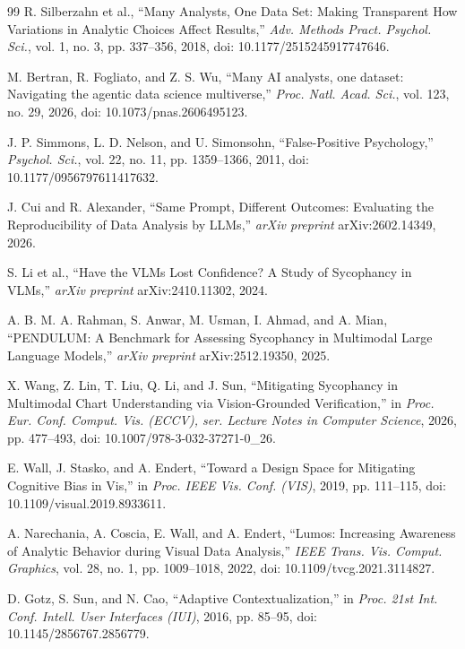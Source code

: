 \documentclass[conference]{IEEEtran}
\begin{document}
\begin{thebibliography}{99}
R. Silberzahn et al., ``Many Analysts, One Data Set: Making Transparent How Variations in Analytic Choices Affect Results,'' \emph{Adv. Methods Pract. Psychol. Sci.}, vol. 1, no. 3, pp. 337--356, 2018, doi: 10.1177/2515245917747646.

M. Bertran, R. Fogliato, and Z. S. Wu, ``Many AI analysts, one dataset: Navigating the agentic data science multiverse,'' \emph{Proc. Natl. Acad. Sci.}, vol. 123, no. 29, 2026, doi: 10.1073/pnas.2606495123.

J. P. Simmons, L. D. Nelson, and U. Simonsohn, ``False-Positive Psychology,'' \emph{Psychol. Sci.}, vol. 22, no. 11, pp. 1359--1366, 2011, doi: 10.1177/0956797611417632.

J. Cui and R. Alexander, ``Same Prompt, Different Outcomes: Evaluating the Reproducibility of Data Analysis by LLMs,'' \emph{arXiv preprint} arXiv:2602.14349, 2026.

S. Li et al., ``Have the VLMs Lost Confidence? A Study of Sycophancy in VLMs,'' \emph{arXiv preprint} arXiv:2410.11302, 2024.

A. B. M. A. Rahman, S. Anwar, M. Usman, I. Ahmad, and A. Mian, ``PENDULUM: A Benchmark for Assessing Sycophancy in Multimodal Large Language Models,'' \emph{arXiv preprint} arXiv:2512.19350, 2025.

X. Wang, Z. Lin, T. Liu, Q. Li, and J. Sun, ``Mitigating Sycophancy in Multimodal Chart Understanding via Vision-Grounded Verification,'' in \emph{Proc. Eur. Conf. Comput. Vis. (ECCV), ser. Lecture Notes in Computer Science}, 2026, pp. 477--493, doi: 10.1007/978-3-032-37271-0\_26.

E. Wall, J. Stasko, and A. Endert, ``Toward a Design Space for Mitigating Cognitive Bias in Vis,'' in \emph{Proc. IEEE Vis. Conf. (VIS)}, 2019, pp. 111--115, doi: 10.1109/visual.2019.8933611.

A. Narechania, A. Coscia, E. Wall, and A. Endert, ``Lumos: Increasing Awareness of Analytic Behavior during Visual Data Analysis,'' \emph{IEEE Trans. Vis. Comput. Graphics}, vol. 28, no. 1, pp. 1009--1018, 2022, doi: 10.1109/tvcg.2021.3114827.

D. Gotz, S. Sun, and N. Cao, ``Adaptive Contextualization,'' in \emph{Proc. 21st Int. Conf. Intell. User Interfaces (IUI)}, 2016, pp. 85--95, doi: 10.1145/2856767.2856779.


\end{thebibliography}
\end{document}
